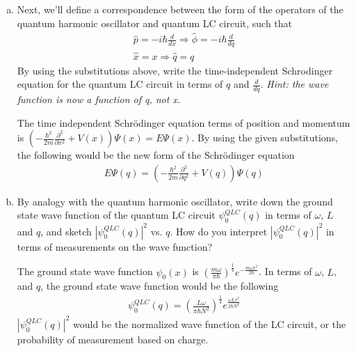 \documentclass[10pt,letterpaper]{article}
\begin{document}
\begin{enumerate}
\begin{enumerate}[a)]
Then, by equating the potential energy term with the electrical energy term, write down an expression for $\omega$ in terms of $L$ and $C$. How does $\omega$ for the quantum LC circuit relate to the resonant frequency of the classical LC circuit?

\color{violet}
By equating $\frac{\hat{q}^{2}}{2m}$ and $\frac{(N\Phi)^{2}}{2L}$, the following expression will be made
$$m = \frac{L}{N^{2}}$$
And then, $\frac{1}{2}m\omega^{2}x^{2}$ and $\frac{1}{2}\frac{\hat{x}^{2}}{C}$.
$$\omega = \frac{N}{\sqrt{LC}}$$
\color{black}

\item Next, we’ll define a correspondence between the form of the operators of the quantum harmonic oscillator and quantum LC circuit, such that
\begin{gather*}
\hat{p} = -i\hbar\frac{d}{dx} \Rightarrow \hat{\phi} = -i\hbar\frac{d}{dq} \\
\hat{x} = x \Rightarrow \hat{q} = q
\end{gather*}
By using the substitutions above, write the time-independent Schrodinger equation for the quantum LC circuit in terms of $q$ and $\frac{d}{dq}$. \textit{Hint: the wave function is now a function of q, not x.}

\color{violet}
The time independent Schrödinger equation terms of position and momentum is $\left( -\frac{\hbar^{2}}{2m}\frac{\partial^{2}}{\partial x^{2}} + V(x) \right)\Psi(x) = E\Psi(x)$. By using the given substitutions, the following would be the new form of the Schrödinger equation
\begin{gather*}
E\Psi(q) = \left( -\frac{\hbar^{2}}{2m} \frac{\partial^{2}}{\partial q^{2}} + V(q) \right)\Psi(q)
\end{gather*}
\color{black}

\item By analogy with the quantum harmonic oscillator, write down the ground state wave function of the quantum LC circuit $\psi_{0}^{QLC} (q)$ in terms of $\omega$, $L$ and $q$, and sketch $|\psi_{0}^{QLC}(q)|^{2}$ vs. $q$. How do you interpret $|\psi_{0}^{QLC}(q)|^{2}$ in terms of measurements on the wave function?

\color{violet}
The ground state wave function $\psi_{0}(x)$ is $\left( \frac{m\omega}{\pi\hbar} \right)^{\frac{1}{4}}e^{-\frac{m\omega x^{2}}{2\hbar}}$. In terms of $\omega$, $L$, and $q$, the ground state wave function would be the following
\begin{gather*}
\psi_{0}^{QLC}(q) = \left( \frac{L\omega}{\pi\hbar N^{2}} \right)^{\frac{1}{4}} e^{\frac{\omega Lx^{2}}{2\hbar N^{2}}}
\end{gather*}
$|\psi_{0}^{QLC}(q)|^{2}$ would be the normalized wave function of the LC circuit, or the probability of measurement based on charge. 
\color{black}


\end{enumerate}
\end{enumerate}
\end{document}
